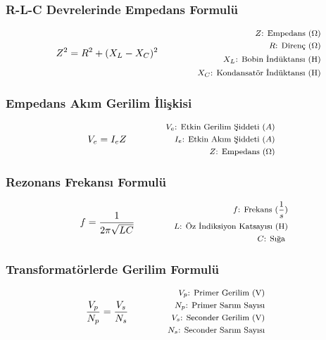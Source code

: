 \subsubsection*{R-L-C Devrelerinde Empedans Formulü}
\begin{equation}
    Z^2 = R^2 + (X_L - X_C)^2\qquad \qquad \parbox{4cm}{\footnotesize$\begin{aligned}
        Z\text{: Empedans } (\Omega) \\
        R\text{: Direnç } (\Omega) \\
        X_L\text{: Bobin İndüktansı (H)} \\
        X_C\text{: Kondansatör İndüktansı (H)}
\end{aligned}$}
\end{equation}

\subsubsection*{Empedans Akım Gerilim İlişkisi}
\begin{equation}
  V_e = I_eZ\qquad \qquad \parbox{4cm}{\footnotesize$\begin{aligned}
      V_e\text{: Etkin Gerilim Şiddeti } (A) \\
      I_e\text{: Etkin Akım Şiddeti } (A) \\
      Z\text{: Empedans } (\Omega)
\end{aligned}$}
\end{equation}

\subsubsection*{Rezonans Frekansı Formulü}
\begin{equation}
  f = \frac{1}{2 \pi \sqrt{LC}}\qquad \qquad \parbox{4cm}{\footnotesize$\begin{aligned}
      f\text{: Frekans } (\frac{1}{s}) \\
      L\text{: Öz İndiksiyon Katsayısı (H)} \\
      C\text{: Sığa }
\end{aligned}$}
\end{equation}

\subsubsection*{Transformatörlerde Gerilim Formulü}
\begin{equation}
  \frac{V_p}{N_p} = \frac{V_s}{N_s} \qquad \qquad \parbox{4cm}{\footnotesize$\begin{aligned}
      V_p\text{: Primer Gerilim (V)} \\
      N_p\text{: Primer Sarım Sayısı} \\
      V_s\text{: Seconder Gerilim (V)} \\
      N_s\text{: Seconder Sarım Sayısı}
\end{aligned}$}
\end{equation}


